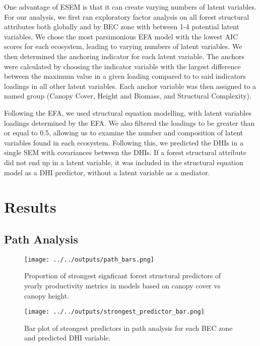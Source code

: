 \documentclass[
  authoryear,
  review,
  3p,
  twocolumn]{elsarticle}
\begin{document}
One advantage of ESEM is that it can create varying numbers of latent
variables. For our analysis, we first ran exploratory factor analysis on
all forest structural attributes both globally and by BEC zone with
between 1-4 potential latent variables. We chose the most parsimonious
EFA model with the lowest AIC scores for each ecosystem, leading to
varying numbers of latent variables. We then determined the anchoring
indicator for each latent variable. The anchors were calculated by
choosing the indicator variable with the largest difference between the
maximum value in a given loading compared to to said indicators loadings
in all other latent variables. Each anchor variable was then assigned to
a named group (Canopy Cover, Height and Biomass, and Structural
Complexity).

Following the EFA, we used structural equation modelling, with latent
variables loadings determined by the EFA. We also filtered the loadings
to be greater than or equal to 0.5, allowing us to examine the number
and composition of latent variables found in each ecosystem. Following
this, we predicted the DHIs in a single SEM with covariances between the
DHIs. If a forest structural attribute did not end up in a latent
variable, it was included in the structural equation model as a DHI
predictor, without a latent variable as a mediator.

\hypertarget{results}{%
\section{Results}\label{results}}

\hypertarget{path-analysis-1}{%
\subsection{Path Analysis}\label{path-analysis-1}}

\begin{figure}

{\centering \texttt{[image: ../../outputs/path\_bars.png]}

}

\caption{\label{fig-pathbar-prop}Proportion of strongest signficant
forest structural predictors of yearly productivity metrics in models
based on canopy cover vs canopy height.}

\end{figure}

\begin{figure}

{\centering \texttt{[image: ../../outputs/strongest\_predictor\_bar.png]}

}

\caption{\label{fig-pathbar-pred}Bar plot of strongest predictors in
path analysis for each BEC zone and predicted DHI variable.}

\end{figure}
\end{document}
